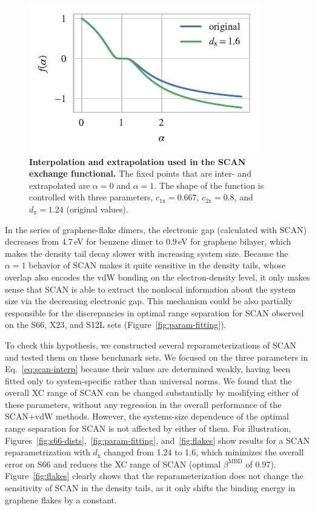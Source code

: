 \begin{figure}[t!]
\centering
\includegraphics{media/scan-interp}
\caption{\textbf{Interpolation and extrapolation used in the SCAN exchange functional.}
The fixed points that are inter- and extrapolated are $\alpha=0$ and $\alpha=1$.
The shape of the function is controlled with three parameters, $c_\mathrm{1x}=0.667$, $c_\mathrm{2x}=0.8$, and $d_\mathrm x=1.24$ (original values).
}\label{fig:scan-interp}
\end{figure}

In the series of graphene-flake dimers, the electronic gap (calculated with SCAN) decreases from 4.7\,eV for benzene dimer to 0.9\,eV for graphene bilayer, which makes the density tail decay slower with increasing system size.
Because the $\alpha=1$ behavior of SCAN makes it quite sensitive in the density tails, whose overlap also encodes the vdW bonding on the electron-density level, it only makes sense that SCAN is able to extract the nonlocal information about the system size via the decreasing electronic gap.
This mechanism could be also partially responsible for the discrepancies in optimal range separation for SCAN observed on the S66, X23, and S12L sets (Figure~\ref{fig:param-fitting}).

To check this hypothesis, we constructed several reparameterizations of SCAN and tested them on these benchmark sets.
We focused on the three parameters in Eq.~\ref{eq:scan-interp} because their values are determined weakly, having been fitted only to system-specific rather than universal norms.
We found that the overall XC range of SCAN can be changed substantially by modifying either of these parameters, without any regression in the overall performance of the SCAN+vdW methods.
However, the systems-size dependence of the optimal range separation for SCAN is not affected by either of them.
For illustration, Figures~\ref{fig:s66-dists},~\ref{fig:param-fitting}, and~\ref{fig:flakes} show results for a SCAN reparametrization with $d_\mathrm x$ changed from 1.24 to 1.6, which minimizes the overall error on S66 and reduces the XC range of SCAN (optimal $\beta^\text{MBD}$ of 0.97).
Figure~\ref{fig:flakes} clearly shows that the reparameterization does not change the sensitivity of SCAN in the density tails, as it only shifts the binding energy in graphene flakes by a constant.

